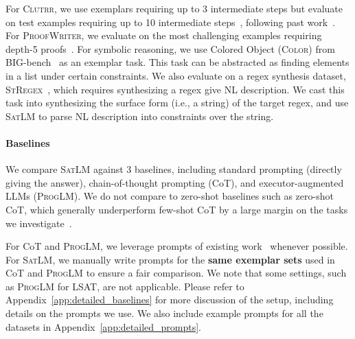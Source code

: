 \documentclass{article}
\theoremstyle{definition}
\newcommand\gd[1]{\todo[color=red!40]{{\bf Greg}: #1}}
\newcommand{\lsat}{\textsc{LSAT}}
\newcommand{\clutrr}{\textsc{Clutrr}}
\newcommand{\colorobj}{\textsc{Color}}
\newcommand{\proofwriter}{\textsc{ProofWriter}}
\newcommand{\stregex}{\textsc{StRegex}}
\newcommand{\satlm}{\textsc{SatLM}}
\newcommand{\pallm}{\textsc{ProgLM}}
\begin{document}
For \clutrr{}, we use exemplars requiring up to 3 intermediate steps but evaluate on test examples requiring up to 10 intermediate steps~\citep{clutrr}, following past work~\citep{faithfulcot}. For \proofwriter{}, we evaluate on the most challenging examples requiring depth-5 proofs~\citep{proofwriter}. For symbolic reasoning, we use Colored Object (\colorobj{}) from BIG-bench~\citep{bigbench} as an exemplar task. This task can be abstracted as finding elements in a list under certain constraints. We also evaluate on a regex synthesis dataset, \stregex{}~\citep{structuredregex}, which requires synthesizing a regex give NL description. We cast this task into synthesizing the surface form (i.e., a string) of the target regex, and use \satlm{} to parse NL description into constraints over the string. %


\paragraph{Baselines}
We compare \satlm{} against 3 baselines, including standard prompting (directly giving the answer), chain-of-thought prompting ({\sc CoT}), and executor-augmented LLMs (\pallm{}). We do not compare to zero-shot baselines such as zero-shot CoT, which generally underperform few-shot CoT by a large margin on the tasks we investigate~\citep{zerocot}.

For {\sc CoT} and \pallm{}, we leverage prompts of existing work~\citep{pal,faithfulcot,creswell2023selectioninference} whenever possible. For \satlm{}, we manually write prompts for the \textbf{same exemplar sets} used in {\sc CoT} and \pallm{} to ensure a fair comparison. We note that some settings, such as \pallm{} for \lsat{}, are not applicable. Please refer to Appendix~\ref{app:detailed_baselines} for more discussion of the setup, including details on the prompts we use. We also include example prompts for all the datasets in Appendix~\ref{app:detailed_prompts}.
  
\end{document}
